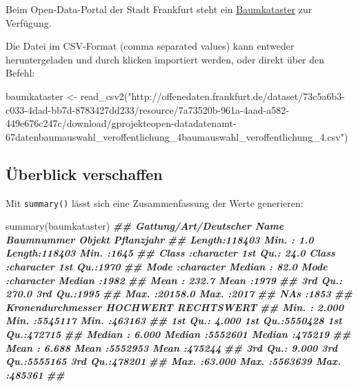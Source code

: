 \documentclass[
  ngerman,
]{article}
\newenvironment{Shaded}{\begin{snugshade}}{\end{snugshade}}
\newcommand{\DocumentationTok}[1]{\textcolor[rgb]{0.56,0.35,0.01}{\textbf{\textit{#1}}}}
\newcommand{\FunctionTok}[1]{\textcolor[rgb]{0.00,0.00,0.00}{#1}}
\newcommand{\NormalTok}[1]{#1}
\newcommand{\OtherTok}[1]{\textcolor[rgb]{0.56,0.35,0.01}{#1}}
\newcommand{\StringTok}[1]{\textcolor[rgb]{0.31,0.60,0.02}{#1}}
\begin{document}
Beim Open-Data-Portal der Stadt Frankfurt steht ein \href{http://offenedaten.frankfurt.de/dataset/baumkataster-frankfurt-am-main}{Baumkataster} zur Verfügung.

Die Datei im CSV-Format (comma separated values) kann entweder heruntergeladen und durch klicken importiert werden, oder direkt über den Befehl:

\begin{Shaded}
\begin{Highlighting}[]
\NormalTok{baumkataster }\OtherTok{\textless{}{-}} \FunctionTok{read\_csv2}\NormalTok{(}\StringTok{"http://offenedaten.frankfurt.de/dataset/73c5a6b3{-}c033{-}4dad{-}bb7d{-}8783427dd233/resource/7a73520b{-}961a{-}4aad{-}a582{-}449e676c247c/download/gprojekteopen{-}datadatenamt{-}67datenbaumauswahl\_veroffentlichung\_4baumauswahl\_veroffentlichung\_4.csv"}\NormalTok{)}
\end{Highlighting}
\end{Shaded}

\hypertarget{uxfcberblick-verschaffen}{%
\subsection{Überblick verschaffen}\label{uxfcberblick-verschaffen}}

Mit \texttt{summary()} lässt sich eine Zusammenfassung der Werte generieren:

\begin{Shaded}
\begin{Highlighting}[]
\FunctionTok{summary}\NormalTok{(baumkataster)}
\DocumentationTok{\#\#  Gattung/Art/Deutscher Name   Baumnummer         Objekt            Pflanzjahr  }
\DocumentationTok{\#\#  Length:118403              Min.   :    1.0   Length:118403      Min.   :1645  }
\DocumentationTok{\#\#  Class :character           1st Qu.:   24.0   Class :character   1st Qu.:1970  }
\DocumentationTok{\#\#  Mode  :character           Median :   82.0   Mode  :character   Median :1982  }
\DocumentationTok{\#\#                             Mean   :  232.7                      Mean   :1979  }
\DocumentationTok{\#\#                             3rd Qu.:  270.0                      3rd Qu.:1995  }
\DocumentationTok{\#\#                             Max.   :20158.0                      Max.   :2017  }
\DocumentationTok{\#\#                             NA\textquotesingle{}s   :1853                                       }
\DocumentationTok{\#\#  Kronendurchmesser    HOCHWERT         RECHTSWERT    }
\DocumentationTok{\#\#  Min.   : 2.000    Min.   :5545117   Min.   :463163  }
\DocumentationTok{\#\#  1st Qu.: 4.000    1st Qu.:5550428   1st Qu.:472715  }
\DocumentationTok{\#\#  Median : 6.000    Median :5552601   Median :475219  }
\DocumentationTok{\#\#  Mean   : 6.688    Mean   :5552953   Mean   :475244  }
\DocumentationTok{\#\#  3rd Qu.: 9.000    3rd Qu.:5555165   3rd Qu.:478201  }
\DocumentationTok{\#\#  Max.   :63.000    Max.   :5563639   Max.   :485361  }
\DocumentationTok{\#\# }
\end{Highlighting}
\end{Shaded}
\end{document}
